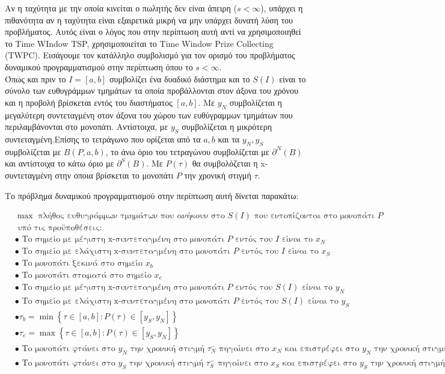 \documentclass[oneside,12pt]{book}
\theoremstyle{definition}
\begin{document}
Αν η ταχύτητα με την οποία κινείται ο πωλητής δεν είναι άπειρη (\(s < \infty\)), υπάρχει η πιθανότητα αν η ταχύτητα είναι εξαιρετικά μικρή να μην υπάρχει δυνατή λύση του προβλήματος. Αυτός είναι ο λόγος που στην περίπτωση αυτή αντί να χρησιμοποιηθεί το Time WIndow TSP, χρησιμοποιείται το Time Window Prize Collecting (TWPC). Εισάγουμε τον κατάλληλο συμβολισμό για τον ορισμό του προβλήματος δυναμικού προγραμματισμού στην περίπτωση όπου το \(s < \infty\). \\

Όπως και πριν το \(I = [a,b]\) συμβολίζει ένα δυαδικό διάστημα και το \(S(I)\) είναι το σύνολο των ευθυγράμμων τμημάτων τα οποία προβάλλονται στον άξονα του χρόνου και η προβολή βρίσκεται εντός του διαστήματος \([a,b]\). Με \(y_N\) συμβολίζεται η μεγαλύτερη συντεταγμένη στον άξονα του χώρου των ευθύγραμμων τμημάτων που περιλαμβάνονται στο μονοπάτι. Αντίστοιχα, με \(y_S\) συμβολίζεται η μικρότερη συντεταγμένη.Επίσης το τετράγωνο που ορίζεται από τα \(a,b\) και τα \(y_N, y_S\) συμβολίζεται με \(B(P,a,b)\), το άνω όριο του τετραγώνου συμβολίζεται με \(\partial^{N}(B)\) και αντίστοιχα το κάτω όριο με \(\partial^{S}(B)\). Με \(P(τ)\) θα συμβολόζεται η x-συντεταγμένη στην οποια βρίσκεται το μονοπάτι \(P\) την χρονική στιγμή \(τ\).

Το πρόβλημα δυναμικού προγραμματισμού στην περίπτωση αυτή δίνεται παρακάτω:

\begin{align*}
&\max \text{ πλήθος ευθυγράμμων τμημάτων που ανήκουν στο } S(I) \text{ που εντοπίζονται στο μονοπάτι } P \\
&\text{ υπό τις προϋποθέσεις:} \\
&\bullet \text{ Το σημείο με μέγιστη x-συντεταγμένη στο μονοπάτι } P \text{ εντός του } Ι \text{ είναι το } x_N  \\
&\bullet \text{ Το σημείο με ελάχιστη x-συντεταγμένη στο μονοπάτι } P \text{ εντός του } Ι \text{ είναι το } x_S  \\
&\bullet \text{ Το μονοπάτι ξεκινά στο σημείο } x_b \\
&\bullet \text{ Το μονοπάτι σταματά στο σημείο } x_e \\
&\bullet \text{ Το σημείο με μέγιστη x-συντεταγμένη στο μονοπάτι } P \text{ εντός του } S(I) \text{ είναι το } y_N  \\
&\bullet \text{ Το σημείο με ελάχιστη x-συντεταγμένη στο μονοπάτι } P \text{ εντός του } S(I) \text{ είναι το } y_S  \\
&\bullet τ_b = \min \left\{ τ \in [a,b] : P(τ) \in [y_S, y_N] \right\}  \\
&\bullet τ_e = \max \left\{ τ \in [a,b] : P(τ) \in [y_S, y_N] \right\}  \\
&\bullet \text{ Το μονοπάτι φτάνει στο } y_N \text{ την χρονική στιγμή } τ_{N}^{-} \text{ πηγαίνει στο } x_N \text{ και επιστρέφει στο } y_N \text{ την χρονική στιγμή } τ_{N}^{+} \\
&\bullet \text{ Το μονοπάτι φτάνει στο } y_S \text{ την χρονική στιγμή } τ_{S}^{-} \text{ πηγαίνει στο } x_S \text{ και επιστρέφει στο } y_S \text{ την χρονική στιγμή } τ_{S}^{+} 
\end{align*} 
\end{document}

